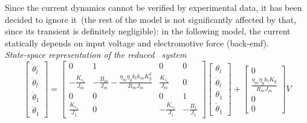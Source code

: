 Since the current dynamics cannot be verified by experimental data, it has been decided to ignore it~(the rest of the model is not significantly affected by that, since its transient is definitely negligible): in the following model, the current statically depends on input voltage and electromotive force (back-emf). \\

\noindent \textit{State-space representation of the reduced \onedof\ system}
\begin{equation}
	\begin{bmatrix}
		\dot{\theta}_l \\
		\ddot{\theta}_l \\
		\dot{\theta}_1 \\
		\ddot{\theta}_1
	\end{bmatrix}
	=
	\begin{bmatrix}
		0 &1 & 0 & 0 \\
		-\frac{K_{s_1}}{J_m} & -\frac{B_m}{J_m}-\frac{\eta_m \eta_g k_t k_m K^2_g}{R_m J_m}  & \frac{K_{s_1}}{J_m} & 0 \\
		0 & 0 & 0 & 1 \\
		\frac{K_{s_1}}{J_1} & 0 & -\frac{K_{s_1}}{J_1} & -\frac{B_1}{J_1}
	\end{bmatrix}
	\begin{bmatrix}
		\theta_l \\
		\dot{\theta}_l \\
		\theta_1 \\
		\dot{\theta}_1
	\end{bmatrix}
	+
	\begin{bmatrix}
		0 \\
		\frac{\eta_m \eta_g k_t K_g}{R_m J_m} \\
		0 \\
		0
	\end{bmatrix}
	V
\end{equation}

